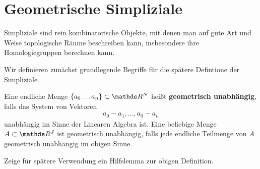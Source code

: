 





\section{Geometrische Simpliziale}

Simpliziale sind rein kombinatorische Objekte, mit denen man auf gute
Art und Weise topologische Räume beschreiben kann, insbesondere ihre
Homologiegruppen berechnen kann.

Wir definieren zunächst grundlegende Begriffe für die spätere
Defintione der Simpliziale.

\begin{Def}
  \label{def:1}
  Eine endliche Menge $\{ a_0\ldots a_n \} \subset \R^N$ heißt
  \textbf{geometrisch unabhängig}, falls das System von Vektoren
  \begin{gather*}
    a_0 - a_1 , \ldots , a_0 - a_n
  \end{gather*}
  unabhängig im Sinne der Linearen Algebra ist. Eine beliebige Menge
  $A \subset \R^J$ ist geometrisch unabhängig, falls jede endliche
  Teilmenge von $A$ geometrisch unabhängig im obigen Sinne.

\end{Def}

Zeige für spätere Verwendung ein Hilfslemma zur obigen Definition.

